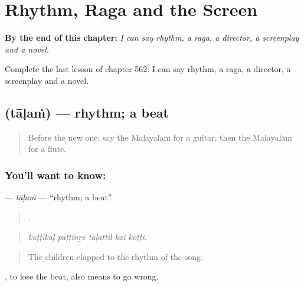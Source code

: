 
\chapter{Rhythm, Raga and the Screen}
\label{ch:ml-rhythm-raga-and-the-screen}

\begin{chapteropening}
\textbf{By the end of this chapter:} \emph{I can say rhythm, a raga, a director, a screenplay and a novel.}

Complete the last lesson of chapter 562: I can say rhythm, a raga, a director, a screenplay and a novel.
\end{chapteropening}

\section[\texorpdfstring{\ml{താളം} (tāḷaṁ)}{താളം (tāḷaṁ)}]{ (tāḷaṁ) — rhythm; a beat}

\label{lesson:ML-C562-talam}



\begin{quote}
Before the new one: say the Malayalam for a guitar, then the Malayalam for a flute.
\end{quote}

\subsection*{You'll want to know: }
\textbf{} — \emph{tāḷaṁ} — \textquotedblleft{}rhythm; a beat\textquotedblright{}.

\begin{quote}
    .
\end{quote}

\begin{quote}
\emph{kuṭṭikaḷ pāṭṭinṟe tāḷattil kai koṭṭi.}
\end{quote}

\begin{quote}
The children clapped to the rhythm of the song.
\end{quote}

 , to lose the beat, also means to go wrong.

